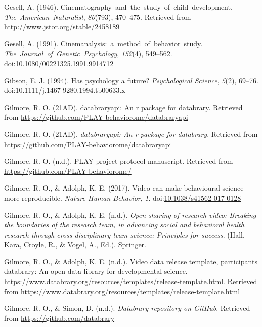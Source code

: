\documentclass[english,man]{apa6}
\theoremstyle{definition}
\theoremstyle{definition}
\theoremstyle{definition}
\theoremstyle{remark}
\begin{document}
\hypertarget{ref-Gesell1946-qr}{}
Gesell, A. (1946). Cinematography~and~the~study~of~child~development.
\emph{The~American~Naturalist}, \emph{80}(793), 470--475. Retrieved from
\url{http://www.jstor.org/stable/2458189}

\hypertarget{ref-Gesell1991-sx}{}
Gesell, A. (1991). Cinemanalysis:~a~method~of~behavior~study.
\emph{The~Journal~of~Genetic~Psychology}, \emph{152}(4), 549--562.
doi:\href{https://doi.org/10.1080/00221325.1991.9914712}{10.1080/00221325.1991.9914712}

\hypertarget{ref-Gibson1994-kb}{}
Gibson, E. J. (1994). Has psychology a future? \emph{Psychological
Science}, \emph{5}(2), 69--76.
doi:\href{https://doi.org/10.1111/j.1467-9280.1994.tb00633.x}{10.1111/j.1467-9280.1994.tb00633.x}

\hypertarget{ref-databraryapi}{}
Gilmore, R. O. (21AD). databraryapi: An r package for databrary.
Retrieved from \url{https://github.com/PLAY-behaviorome/databraryapi}

\hypertarget{ref-R-databraryapi}{}
Gilmore, R. O. (21AD). \emph{databraryapi: An r package for databrary}.
Retrieved from \url{https://github.com/PLAY-behaviorome/databraryapi}

\hypertarget{ref-cite-PLAY-behaviorome}{}
Gilmore, R. O. (n.d.). PLAY project protocol manuscript. Retrieved from
\url{https://github.com/PLAY-behaviorome/}

\hypertarget{ref-Gilmore2017-eh}{}
Gilmore, R. O., \& Adolph, K. E. (2017). Video can make behavioural
science more reproducible. \emph{Nature Human Behavior}, \emph{1}.
doi:\href{https://doi.org/10.1038/s41562-017-0128}{10.1038/s41562-017-0128}

\hypertarget{ref-Gilmore_undated-tp}{}
Gilmore, R. O., \& Adolph, K. E. (n.d.). \emph{Open sharing of research
video: Breaking the boundaries of the research team, in advancing social
and behavioral health research through cross-disciplinary team science:
Principles for success}. (Hall, Kara, Croyle, R., \& Vogel, A., Ed.).
Springer.

\hypertarget{ref-databrary-release}{}
Gilmore, R. O., \& Adolph, K. E. (n.d.). Video data release template,
participants \textbar{}\textbar{} databrary: An open data library for
developmental science.
\url{https://www.databrary.org/resources/templates/release-template.html}.
Retrieved from
\url{https://www.databrary.org/resources/templates/release-template.html}

\hypertarget{ref-databrary-on-github}{}
Gilmore, R. O., \& Simon, D. (n.d.). \emph{Databrary repository on
GitHub}. Retrieved from \url{https://github.com/databrary}
\end{document}
